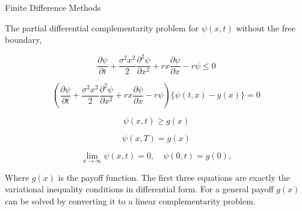 \documentclass{beamer}
\begin{document}
\begin{frame}{Finite Difference Methods}

    {\footnotesize \footnotesize
    The partial differential complementarity problem for \(\psi(x,t)\) without the free boundary,

    \[
    \frac{\partial \psi}{\partial t} + \frac{\sigma^2 x^2}{2} \frac{\partial^2 \psi}{\partial x^2} + rx \frac{\partial \psi}{\partial x} - r\psi \leq 0
    \]

    \[
    \left( \frac{\partial \psi}{\partial t} + \frac{\sigma^2 x^2}{2} \frac{\partial^2 \psi}{\partial x^2} + rx \frac{\partial \psi}{\partial x} - r\psi \right) \{ \psi(t,x) - g(x) \} = 0
    \]

    \[
    \psi(x,t) \geq g(x)
    \]

    \[
    \psi(x,T) = g(x)
    \]

    \[
    \lim_{x \to \infty} \psi(x,t) = 0, \quad \psi(0,t) = g(0),
    \]

   Where $g(x)$ is the payoff function. The first three equations are exactly the variational inequality 
   conditions in differential form.
    For a general payoff \(g(x)\) can be solved by converting it to a 
    linear complementarity problem.

        }
    
\end{frame}



    
\end{document}
